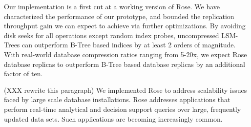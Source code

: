 \documentclass{vldb}
\newcommand{\rows}{Rose\xspace}
\begin{document}

Our implementation is a first cut at a working version of \rows.
We have characterized the performance of our prototype, and
bounded the replication throughput gain we can expect to achieve via further
optimizations.  By avoiding disk seeks for all operations except
random index probes, uncompressed LSM-Trees can outperform
B-Tree based indices by at least 2 orders of magnitude.  With real-world
database compression ratios ranging from 5-20x, we expect \rows
database replicas to outperform B-Tree based database replicas by an
additional factor of ten.

(XXX rewrite this paragraph) We implemented \rows to address scalability issues faced by large
scale database installations.  \rows addresses
applications that perform real-time analytical and decision
support queries over large, frequently updated data sets.
Such applications are becoming increasingly common.


%
%
\balancecolumns %
\end{document}
